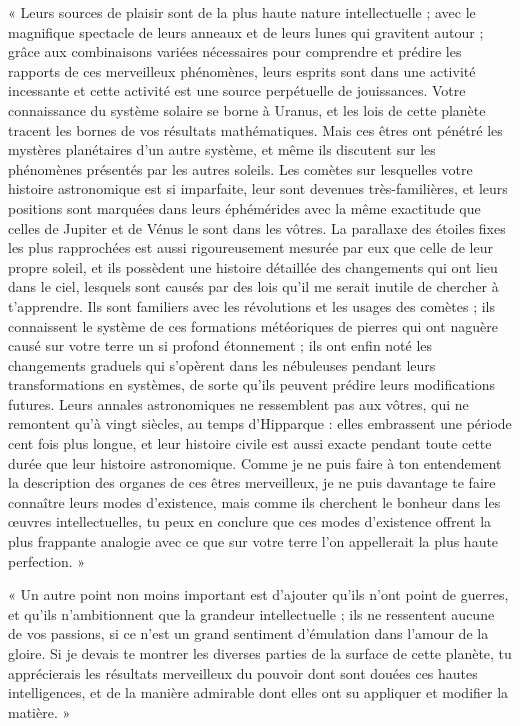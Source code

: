 \documentclass[a4paper, 11pt, oneside]{article}
\begin{document}
« Leurs sources de plaisir sont de la plus haute nature intellectuelle ; avec le magnifique spectacle de leurs anneaux et de leurs lunes qui gravitent autour ; grâce aux combinaisons variées nécessaires pour comprendre et prédire les rapports de ces merveilleux phénomènes, leurs esprits sont dans une activité incessante et cette activité est une source perpétuelle de jouissances. Votre connaissance du système solaire se borne à Uranus, et les lois de cette planète tracent les bornes de vos résultats mathématiques. Mais ces êtres ont pénétré les mystères planétaires d'un autre système, et même ils discutent sur les phénomènes présentés par les autres soleils. Les comètes sur lesquelles votre histoire astronomique est si imparfaite, leur sont devenues très-familières, et leurs positions sont marquées dans leurs éphémérides avec la même exactitude que celles de Jupiter et de Vénus le sont dans les vôtres. La parallaxe des étoiles fixes les plus rapprochées est aussi rigoureusement mesurée par eux que celle de leur propre soleil, et ils possèdent une histoire détaillée des changements qui ont lieu dans le ciel, lesquels sont causés par des lois qu'il me serait inutile de chercher à t'apprendre. Ils sont familiers avec les révolutions et les usages des comètes ; ils connaissent le système de ces formations météoriques de pierres qui ont naguère causé sur votre terre un si profond étonnement ; ils ont enfin noté les changements graduels qui s'opèrent dans les nébuleuses pendant leurs transformations en systèmes, de sorte qu'ils peuvent prédire leurs modifications futures. Leurs annales astronomiques ne ressemblent pas aux vôtres, qui ne remontent qu'à vingt siècles, au temps d'Hipparque : elles embrassent une période cent fois plus longue, et leur histoire civile est aussi exacte pendant toute cette durée que leur histoire astronomique. Comme je ne puis faire à ton entendement la description des organes de ces êtres merveilleux, je ne puis davantage te faire connaître leurs modes d'existence, mais comme ils cherchent le bonheur dans les œuvres intellectuelles, tu peux en conclure que ces modes d'existence offrent la plus frappante analogie avec ce que sur votre terre l'on appellerait la plus haute perfection. »

« Un autre point non moins important est d'ajouter qu'ils n'ont point de guerres, et qu'ils n'ambitionnent que la grandeur intellectuelle ; ils ne ressentent aucune de vos passions, si ce n'est un grand sentiment d'émulation dans l'amour de la gloire. Si je devais te montrer les diverses parties de la surface de cette planète, tu apprécierais les résultats merveilleux du pouvoir dont sont douées ces hautes intelligences, et de la manière admirable dont elles ont su appliquer et modifier la matière. »
\end{document}
